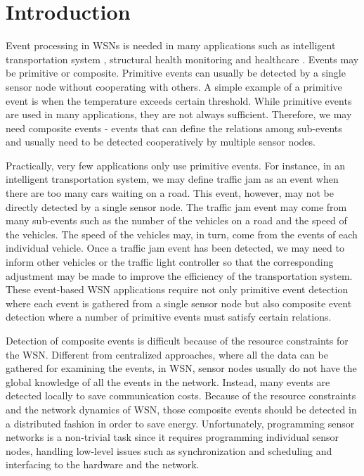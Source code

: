 \section{Introduction}
\label{sec:introduction}
Event processing \cite{jector} in WSNs is needed in many applications such as intelligent transportation system \cite{klein:its}, structural health monitoring \cite{lynch:shm} and healthcare \cite{lo:ban}. Events may be primitive or composite. Primitive events can usually be detected by a single sensor node without cooperating with others. A simple example of a primitive event is when the temperature exceeds certain threshold. While primitive events are used in many applications, they are not always sufficient. Therefore, we may need composite events - events that can define the relations among sub-events and usually need to be detected cooperatively by multiple sensor nodes.

Practically, very few applications only use primitive events. For instance, in an intelligent transportation system, we may define traffic jam as an event when there are too many cars waiting on a road. This event, however, may not be directly detected by a single sensor node. The traffic jam event may come from many sub-events such as the number of the vehicles on a road and the speed of the vehicles. The speed of the vehicles may, in turn, come from the events of each individual vehicle. Once a traffic jam event has been detected, we may need to inform other vehicles or the traffic light controller so that the corresponding adjustment may be made to improve the efficiency of the transportation system. These event-based WSN applications require not only primitive event detection where each event is gathered from a single sensor node but also composite event detection where a number of primitive events must satisfy certain relations.

Detection of composite events is difficult because of the resource constraints for the WSN. Different from centralized approaches, where all the data can be gathered for examining the events, in WSN, sensor nodes usually do not have the global knowledge of all the events in the network. Instead, many events are detected locally to save communication costs. Because of the resource constraints and the network dynamics of WSN, those composite events should be detected in a distributed fashion in order to save energy. Unfortunately, programming sensor networks is a non-trivial task since it requires programming individual sensor nodes, handling low-level issues such as synchronization and scheduling and interfacing to the hardware and the network.

